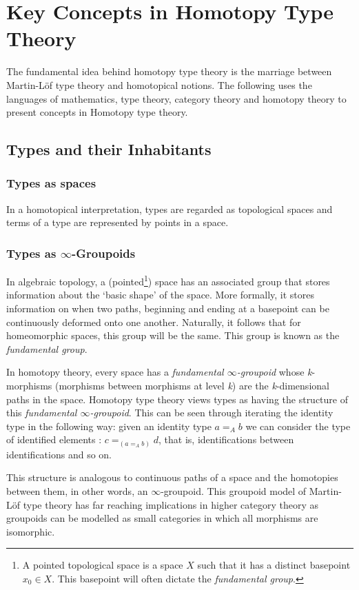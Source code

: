\documentclass[12pt]{report}
\begin{document}
\pagebreak

\section{Key Concepts in Homotopy Type Theory}
The fundamental idea behind homotopy type theory is the marriage between Martin-L\"of type theory and homotopical notions. The following uses the languages of mathematics, type theory, category theory and homotopy theory to present concepts in Homotopy type theory. 
\subsection*{Types and their Inhabitants}
\subsubsection{Types as spaces}
In a homotopical interpretation, types are regarded as topological spaces and terms of a type are represented by points in a space.
\subsubsection{Types as $\infty$-Groupoids}
In algebraic topology, a (pointed\footnote{

A pointed topological space is a space $X$ such that it has a distinct basepoint $x_0 \in X$. This basepoint will often dictate the \textit{fundamental group}.

}) space has an associated group that stores information about the `basic shape' of the space. More formally, it stores information on when two paths, beginning and ending at a basepoint can be continuously deformed onto one another. Naturally, it follows that for homeomorphic spaces, this group will be the same. This group is known as the \textit{fundamental group}.

In homotopy theory, every space has a \textit{fundamental $\infty$-groupoid} whose \textit{k}-morphisms (morphisms between morphisms at level \textit{k}) are the \textit{k}-dimensional paths in the space. Homotopy type theory views types as having the structure of this \textit{fundamental $\infty$-groupoid}. This can be seen through iterating the identity type in the following way: given an identity type $a =_A b$ we can consider the type of identified elements : $c =_{(a =_A b)} d$, that is, identifications between identifications and so on.

This structure is analogous to continuous paths of a space and the homotopies between them, in other words, an $\infty$-groupoid. This groupoid model of Martin-L\"of type theory has far reaching implications in higher category theory as groupoids can be modelled as small categories in which all morphisms are isomorphic.
\end{document}
